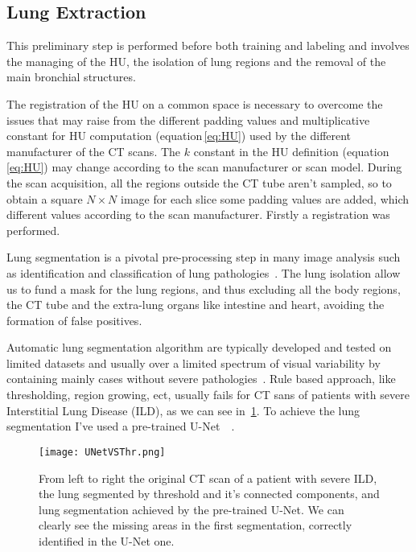 \documentclass{standalone}
\begin{document}
	\subsection*{Lung Extraction}
	
	This preliminary step is performed before both training and labeling and involves the managing of the HU, the isolation of lung regions and the removal of the main bronchial structures.
	
	The registration of the HU on a common space is necessary to overcome the issues that may raise from the different padding values and multiplicative constant for HU computation (equation\,\ref{eq:HU}) used by the different manufacturer of the CT scans. The $k$ constant in the HU definition (equation\,\ref{eq:HU}) may change according to the scan manufacturer or scan model. During the scan acquisition, all the regions outside the CT tube aren't sampled, so to obtain a square $N\times N$ image for each slice some padding values are added, which different values according to the scan manufacturer. Firstly a registration was performed.
	
	
	Lung segmentation is a pivotal pre-processing step in many image analysis such as identification and classification of lung pathologies~\cite{ART:Johannes}. The lung isolation allow us to fund a mask for the lung regions, and thus excluding  all the body regions, the CT tube and the extra-lung organs like intestine and heart, avoiding the formation of false positives.
	
	Automatic lung segmentation algorithm are typically developed and tested on limited datasets and usually over a limited spectrum of visual variability by containing mainly cases without severe pathologies~\cite{ART:Johannes}. Rule based approach, like thresholding, region growing, ect, usually fails for CT sans of patients with severe Interstitial Lung Disease (ILD), as we can see in \figurename\,\ref{fig:UNetVSThr}. To achieve the lung segmentation I've used a pre-trained U-Net~\cite{ART:Johannes}~\cite{REP:lungmask}. 
	\begin{figure}[h!]
		\centering
		\texttt{[image: UNetVSThr.png]}
		\caption{From left to right the original CT scan of a patient with severe ILD, the lung segmented by threshold and it's connected components, and lung segmentation achieved by the pre-trained U-Net. We can clearly see the missing areas in the first segmentation, correctly identified in the U-Net one.}\label{fig:UNetVSThr}
	\end{figure}
\end{document}
